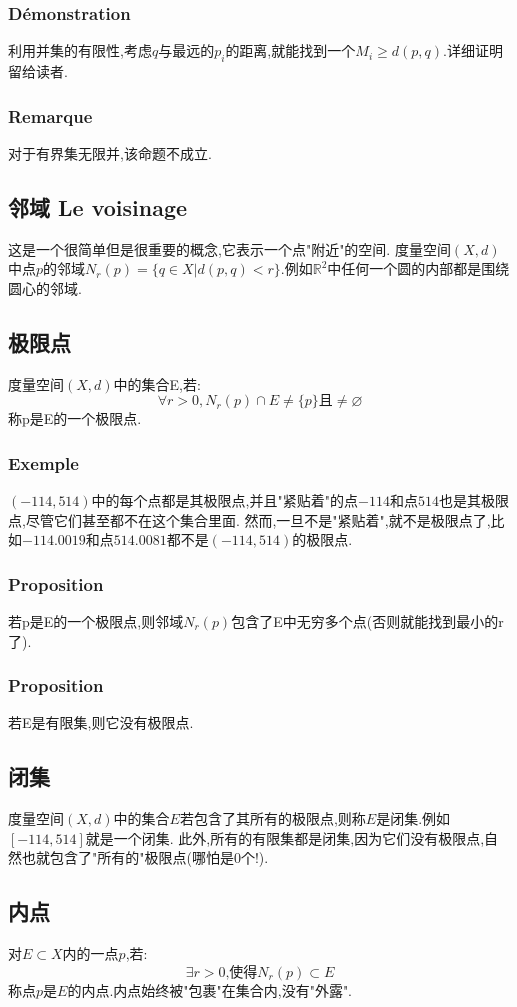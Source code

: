 \documentclass[12pt, a4paper, oneside]{ctexbook}
\newcommand{\R }{\mathbb{R}}%
\begin{document}
  \subsubsection{Démonstration}
  利用并集的有限性,考虑$q$与最远的$p_i$的距离,就能找到一个$M_i\ge d(p,q)$.详细证明留给读者.
  \subsubsection{Remarque}
  对于有界集无限并,该命题不成立.

  \subsection{邻域 Le voisinage}     \label{myref:voisinage}
  这是一个很简单但是很重要的概念,它表示一个点"附近"的空间.
  度量空间$(X,d)$中点$p$的邻域$N_r(p)=\{q\in X | d(p,q)<r\}$.例如$\R^2$中任何一个圆的内部都是围绕圆心的邻域.
  \subsection{极限点}
  度量空间$(X,d)$中的集合E,若:
  $$
  \forall r>0, N_r(p)\cap E\neq\{p\}\mbox{且}\neq\varnothing 
  $$
  称p是E的一个极限点.
  \subsubsection{Exemple}
  $(-114,514)$中的每个点都是其极限点,并且"紧贴着"的点$-114$和点$514$也是其极限点,尽管它们甚至都不在这个集合里面.
  然而,一旦不是"紧贴着",就不是极限点了,比如$-114.0019$和点$514.0081$都不是$(-114,514)$的极限点.
  \subsubsection{Proposition}
  若p是E的一个极限点,则邻域$N_r(p)$包含了E中无穷多个点(否则就能找到最小的r了).
  \subsubsection{Proposition}
  若E是有限集,则它没有极限点.
  \subsection{闭集}
  度量空间$(X,d)$中的集合$E$若包含了其所有的极限点,则称$E$是闭集.例如$[-114,514]$就是一个闭集.
  此外,所有的有限集都是闭集,因为它们没有极限点,自然也就包含了"所有的"极限点(哪怕是0个!).
  \subsection{内点}
  对$E\subset X$内的一点$p$,若:
  $$
    \exists r>0\mbox{,使得}N_r(p)\subset E
  $$称点$p$是$E$的内点.内点始终被"包裹"在集合内,没有"外露".
\end{document}
